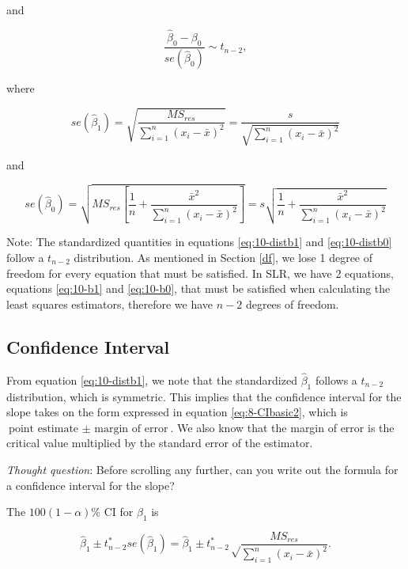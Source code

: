 \documentclass[
]{book}
\begin{document}
and

\begin{equation} 
\frac{\hat{\beta}_0 - \beta_0}{se(\hat{\beta}_0)}\sim t_{n-2},
\label{eq:10-distb0}
\end{equation}

where

\begin{equation}
se(\hat{\beta}_1) = \sqrt{\frac{MS_{res}}{\sum_{i=1}^n{(x_{i}-\bar{x})^{2}}}} = \frac{s}{\sqrt{\sum_{i=1}^n{(x_{i}-\bar{x})^{2}}}}
\label{eq:10-seb1}
\end{equation}

and

\begin{equation} 
se(\hat{\beta}_0) = \sqrt{MS_{res}\left[\frac{1}{n} + \frac{\bar{x}^2}{\sum_{i=1}^n (x_i -\bar{x})^2}\right]} = s \sqrt{\frac{1}{n} + \frac{\bar{x}^2}{\sum_{i=1}^n (x_i -\bar{x})^2}}
\label{eq:10-seb0}
\end{equation}

Note: The standardized quantities in equations \eqref{eq:10-distb1} and \eqref{eq:10-distb0} follow a \(t_{n-2}\) distribution. As mentioned in Section \ref{df}, we lose 1 degree of freedom for every equation that must be satisfied. In SLR, we have 2 equations, equations \eqref{eq:10-b1} and \eqref{eq:10-b0}, that must be satisfied when calculating the least squares estimators, therefore we have \(n-2\) degrees of freedom.

\hypertarget{confidence-interval}{%
\subsection{Confidence Interval}\label{confidence-interval}}

From equation \eqref{eq:10-distb1}, we note that the standardized \(\hat{\beta}_1\) follows a \(t_{n-2}\) distribution, which is symmetric. This implies that the confidence interval for the slope takes on the form expressed in equation \eqref{eq:8-CIbasic2}, which is \(\text{point estimate } \pm \text{ margin of error}\). We also know that the margin of error is the critical value multiplied by the standard error of the estimator.

\emph{Thought question}: Before scrolling any further, can you write out the formula for a confidence interval for the slope?

The \(100(1-\alpha)\%\) CI for \(\beta_1\) is

\begin{equation} 
\hat{\beta}_1 \pm t_{n-2}^*  se(\hat{\beta}_1) = \hat{\beta}_1 \pm t_{n-2}^* {\sqrt\frac{MS_{res}}{\sum_{i=1}^n(x_i - \bar{x})^{2}}}.
\label{eq:10-CIb1}
\end{equation}
\end{document}
